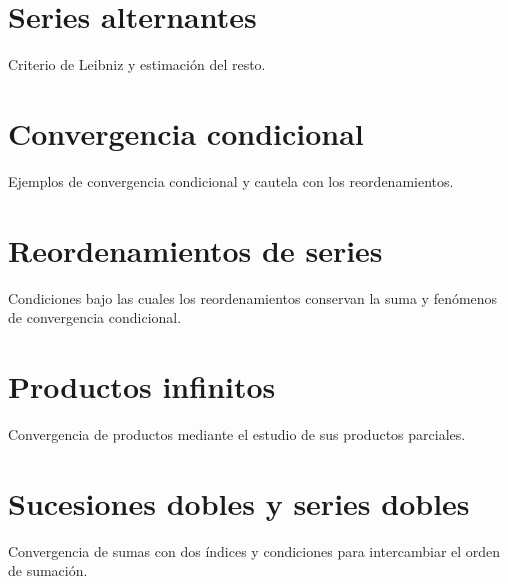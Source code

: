 \section{Series alternantes}
Criterio de Leibniz y estimación del resto.

\section{Convergencia condicional}
Ejemplos de convergencia condicional y cautela con los reordenamientos.

\section{Reordenamientos de series}
Condiciones bajo las cuales los reordenamientos conservan la suma y fenómenos de convergencia condicional.

\section{Productos infinitos}
Convergencia de productos mediante el estudio de sus productos parciales.

\section{Sucesiones dobles y series dobles}
Convergencia de sumas con dos índices y condiciones para intercambiar el orden de sumación.
